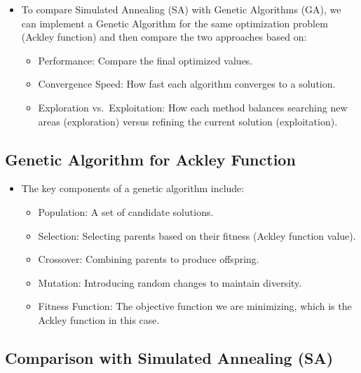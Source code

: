 \documentclass[
  letterpaper,
  DIV=11,
  numbers=noendperiod]{scrreprt}
\providecommand{\tightlist}{%
  \setlength{\itemsep}{0pt}\setlength{\parskip}{0pt}}\usepackage{longtable,booktabs,array}
\begin{document}
\begin{itemize}
\tightlist
\item
  To compare Simulated Annealing (SA) with Genetic Algorithms (GA), we
  can implement a Genetic Algorithm for the same optimization problem
  (Ackley function) and then compare the two approaches based on:

  \begin{itemize}
  \tightlist
  \item
    Performance: Compare the final optimized values.
  \item
    Convergence Speed: How fast each algorithm converges to a solution.
  \item
    Exploration vs.~Exploitation: How each method balances searching new
    areas (exploration) versus refining the current solution
    (exploitation).
  \end{itemize}
\end{itemize}

\subsection{Genetic Algorithm for Ackley
Function}\label{genetic-algorithm-for-ackley-function}

\begin{itemize}
\tightlist
\item
  The key components of a genetic algorithm include:

  \begin{itemize}
  \tightlist
  \item
    Population: A set of candidate solutions.
  \item
    Selection: Selecting parents based on their fitness (Ackley function
    value).
  \item
    Crossover: Combining parents to produce offspring.
  \item
    Mutation: Introducing random changes to maintain diversity.
  \item
    Fitness Function: The objective function we are minimizing, which is
    the Ackley function in this case.
  \end{itemize}
\end{itemize}

\subsection{Comparison with Simulated Annealing
(SA)}\label{comparison-with-simulated-annealing-sa}
\end{document}
